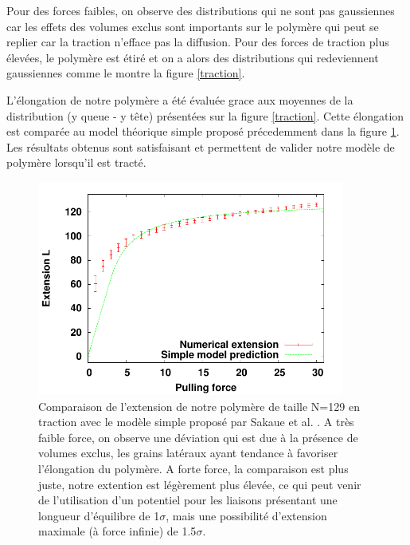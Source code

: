 Pour des forces faibles, on observe des distributions qui ne sont pas gaussiennes car les effets des volumes exclus sont importants sur le polymère qui peut se replier car la traction n'efface pas la diffusion. Pour des forces de traction plus élevées, le polymère est étiré et on a alors des distributions qui redeviennent gaussiennes comme le montre la figure \ref{traction}.


L'élongation de notre polymère a été évaluée grace aux moyennes de la distribution (y queue - y tête) présentées sur la figure \ref{traction}. Cette élongation est comparée au model théorique simple proposé précedemment dans la figure \ref{elongtraction}. Les résultats obtenus sont satisfaisant et permettent de valider notre modèle de polymère lorsqu'il est tracté.


\begin{figure}[H]
\begin{center}
\includegraphics[width=0.9\textwidth]{elongation.pdf}

\caption[Résultats numériques: élongation en traction]{Comparaison de l'extension de notre polymère de taille N=129 en traction avec le modèle simple proposé par Sakaue et al. \cite{Sakaue2012}. A très faible force, on observe une déviation qui est due à la présence de volumes exclus, les grains latéraux ayant tendance à favoriser l'élongation du polymère. A forte force, la comparaison est plus juste, notre extention est légèrement plus élevée, ce qui peut venir de l'utilisation d'un potentiel pour les liaisons présentant une longueur d'équilibre de 1$\sigma$, mais une possibilité d'extension maximale (à force infinie) de 1.5$\sigma$.}
\label{elongtraction}
\end{center}
\end{figure}

